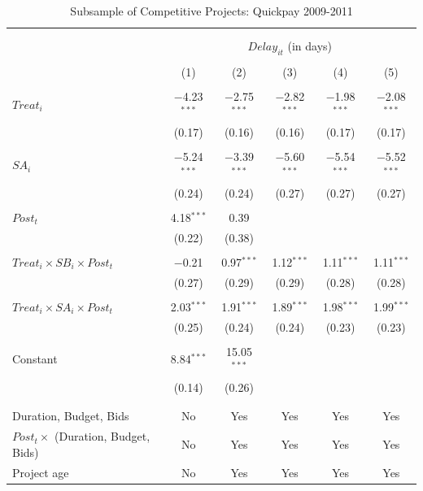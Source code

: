 \documentclass[
]{article}
\begin{document}
\begin{table}[H] \centering 
  \caption{Subsample of Competitive Projects: Quickpay 2009-2011} 
  \label{} 
\small 
\begin{tabular}{@{\extracolsep{-2pt}}lccccc} 
\\[-1.8ex]\hline 
\hline \\[-1.8ex] 
\\[-1.8ex] & \multicolumn{5}{c}{$Delay_{it}$ (in days)} \\ 
\\[-1.8ex] & (1) & (2) & (3) & (4) & (5)\\ 
\hline \\[-1.8ex] 
 $Treat_i$ & $-$4.23$^{***}$ & $-$2.75$^{***}$ & $-$2.82$^{***}$ & $-$1.98$^{***}$ & $-$2.08$^{***}$ \\ 
  & (0.17) & (0.16) & (0.16) & (0.17) & (0.17) \\ 
  & & & & & \\ 
 $SA_i$ & $-$5.24$^{***}$ & $-$3.39$^{***}$ & $-$5.60$^{***}$ & $-$5.54$^{***}$ & $-$5.52$^{***}$ \\ 
  & (0.24) & (0.24) & (0.27) & (0.27) & (0.27) \\ 
  & & & & & \\ 
 $Post_t$ & 4.18$^{***}$ & 0.39 &  &  &  \\ 
  & (0.22) & (0.38) &  &  &  \\ 
  & & & & & \\ 
 $Treat_i \times SB_i \times Post_t$ & $-$0.21 & 0.97$^{***}$ & 1.12$^{***}$ & 1.11$^{***}$ & 1.11$^{***}$ \\ 
  & (0.27) & (0.29) & (0.29) & (0.28) & (0.28) \\ 
  & & & & & \\ 
 $Treat_i \times SA_i \times Post_t$ & 2.03$^{***}$ & 1.91$^{***}$ & 1.89$^{***}$ & 1.98$^{***}$ & 1.99$^{***}$ \\ 
  & (0.25) & (0.24) & (0.24) & (0.23) & (0.23) \\ 
  & & & & & \\ 
 Constant & 8.84$^{***}$ & 15.05$^{***}$ &  &  &  \\ 
  & (0.14) & (0.26) &  &  &  \\ 
  & & & & & \\ 
\hline \\[-1.8ex] 
Duration, Budget, Bids & No & Yes & Yes & Yes & Yes \\ 
$Post_t \times $  (Duration, Budget, Bids) & No & Yes & Yes & Yes & Yes \\ 
Project age & No & Yes & Yes & Yes & Yes \\ 

\end{tabular}
\end{table}
\end{document}
